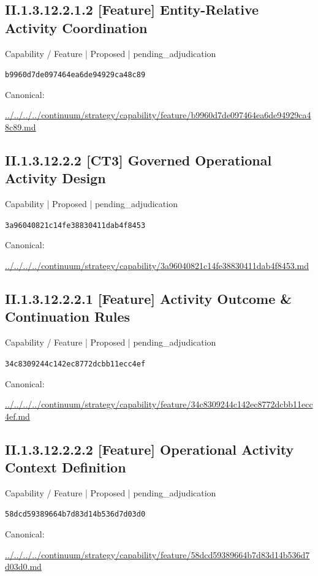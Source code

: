 \documentclass[10pt,a4paper]{article}
\begin{document}
\subsection*{II.1.3.12.2.1.2 [Feature] Entity-Relative Activity Coordination}
{\small Capability / Feature | Proposed | pending\_adjudication}\par
\texttt{b9960d7de097464ea6de94929ca48c89}\par
Canonical: \par
{\footnotesize\url{../../../../continuum/strategy/capability/feature/b9960d7de097464ea6de94929ca48c89.md}}\par
\subsection*{II.1.3.12.2.2 [CT3] Governed Operational Activity Design}
{\small Capability | Proposed | pending\_adjudication}\par
\texttt{3a96040821c14fe38830411dab4f8453}\par
Canonical: \par
{\footnotesize\url{../../../../continuum/strategy/capability/3a96040821c14fe38830411dab4f8453.md}}\par
\subsection*{II.1.3.12.2.2.1 [Feature] Activity Outcome \& Continuation Rules}
{\small Capability / Feature | Proposed | pending\_adjudication}\par
\texttt{34c8309244c142ec8772dcbb11ecc4ef}\par
Canonical: \par
{\footnotesize\url{../../../../continuum/strategy/capability/feature/34c8309244c142ec8772dcbb11ecc4ef.md}}\par
\subsection*{II.1.3.12.2.2.2 [Feature] Operational Activity Context Definition}
{\small Capability / Feature | Proposed | pending\_adjudication}\par
\texttt{58dcd59389664b7d83d14b536d7d03d0}\par
Canonical: \par
{\footnotesize\url{../../../../continuum/strategy/capability/feature/58dcd59389664b7d83d14b536d7d03d0.md}}\par
\end{document}
